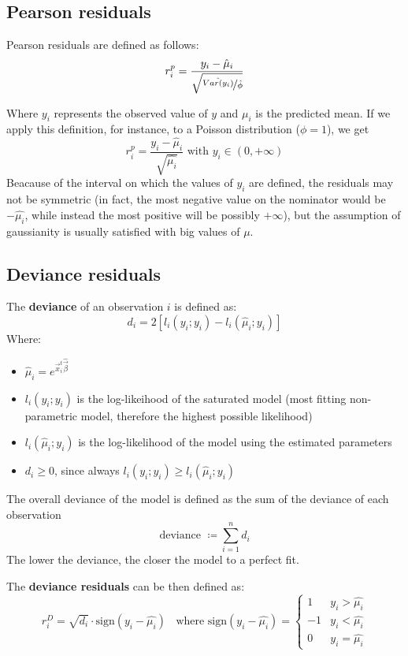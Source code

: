     \subsection{Pearson residuals}
      Pearson residuals are defined as follows:
      $$r_i^p = \frac{y_i -
      \hat{\mu}_i}{\sqrt{\nicefrac{\hat{Var(y_i)}}{\hat{\phi}}}}$$

      Where $y_i$ represents the observed value of $y$ and $\mu_i$ is the
      predicted mean. If we apply this definition, for instance, to a Poisson
      distribution ($\phi = 1$), we get 
      $$r_i^p = \frac{y_i - \hat{\mu}_i}{\sqrt{\hat{\mu_i}}} \text{ with } y_i
      \in (0, +\infty)$$ Beacause of the interval on which the values of $y_i$
      are defined, the residuals may not be symmetric (in fact, the most
      negative value on the nominator would be $-\hat{\mu_i}$, while instead the
      most positive will be possibly $+\infty$), but the assumption of
      gaussianity is usually satisfied with big values of $\mu$.

    \subsection{Deviance residuals}
      The \textbf{deviance} of an observation $i$ is defined as:
        $$d_i = 2[l_i(y_i; y_i) - l_i(\hat{\mu}_i; y_i)]$$ Where:
      \begin{itemize}
        \item $\hat{\mu}_i = e^{\vec{x}_i^t\hat{\vec{\beta}}}$
        \item $l_i(y_i; y_i)$ is the log-likeihood of the saturated model (most
        fitting non-parametric model, therefore the highest possible likelihood)
        \item $l_i(\hat{\mu}_i; y_i)$ is the log-likelihood of the model using
        the estimated parameters
        \item $d_i \geq 0$, since always $l_i(y_i; y_i) \geq l_i(\hat{\mu}_i; y_i)$
      \end{itemize} \vspace{\baselineskip}
      The overall deviance of the model is defined as the sum of the deviance of
      each observation
      $$\text{deviance } \coloneqq \sum_{i = 1}^n d_i$$ The lower the deviance,
      the closer the model to a perfect fit.
      
      The \textbf{deviance residuals} can be then defined as:
      $$r_i^D = \sqrt{d_i} \cdot \text{sign}(y_i - \hat{\mu_i})\;\; \text{ where
      sign}(y_i - \hat{\mu_i}) = 
      \begin{cases}
        1  & y_i>\hat{\mu_i} \\
        -1 & y_i<\hat{\mu_i} \\
        0  & y_i=\hat{\mu_i}
      \end{cases}
      $$
